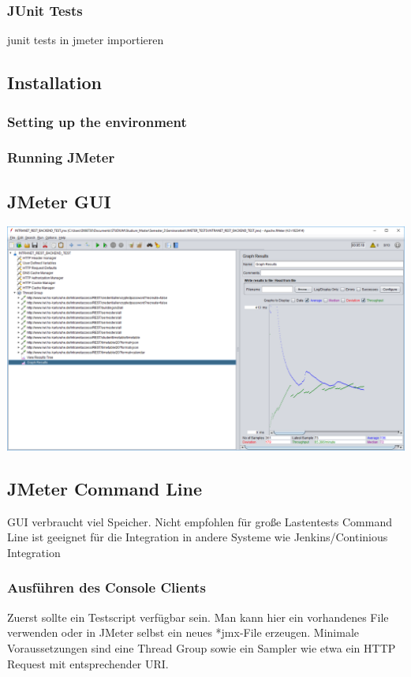 \documentclass[a4paper,12pt]{article}
\begin{document}
\subsubsection{JUnit Tests}
junit tests in jmeter importieren
\subsection{Installation}
\subsubsection{Setting up the environment}
\subsubsection{Running JMeter}

\subsection{JMeter GUI}
\includegraphics[width=1\textwidth]{bilder/jmeter_2.png}\par\vspace{1cm}

\subsection{JMeter Command Line}
GUI verbraucht viel Speicher. Nicht empfohlen für große Lastentests
Command Line ist geeignet für die Integration in andere Systeme wie Jenkins/Continious Integration
\subsubsection{Ausführen des Console Clients}
Zuerst sollte ein Testscript verfügbar sein. Man kann hier ein vorhandenes File verwenden oder in JMeter selbst ein neues *jmx-File erzeugen. Minimale Voraussetzungen sind eine Thread Group sowie ein Sampler wie etwa ein HTTP Request mit entsprechender URI.
\end{document}
